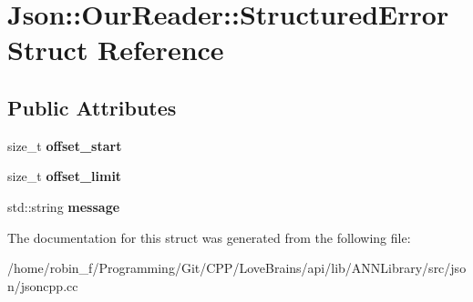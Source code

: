 \section{Json\+:\+:Our\+Reader\+:\+:Structured\+Error Struct Reference}
\label{struct_json_1_1_our_reader_1_1_structured_error}
\subsection*{Public Attributes}
\begin{DoxyCompactItemize}
\item 
size\+\_\+t {\bfseries offset\+\_\+start}\label{struct_json_1_1_our_reader_1_1_structured_error_a4eec161c2a6b4c89b6eb3d8d83834443}

\item 
size\+\_\+t {\bfseries offset\+\_\+limit}\label{struct_json_1_1_our_reader_1_1_structured_error_a6bab2650e5230fc15427b309de79fdbe}

\item 
std\+::string {\bfseries message}\label{struct_json_1_1_our_reader_1_1_structured_error_adc8a757b6452cc6ab14fb90b933b3414}

\end{DoxyCompactItemize}


The documentation for this struct was generated from the following file\+:\begin{DoxyCompactItemize}
\item 
/home/robin\+\_\+f/\+Programming/\+Git/\+C\+P\+P/\+Love\+Brains/api/lib/\+A\+N\+N\+Library/src/json/jsoncpp.\+cc\end{DoxyCompactItemize}

